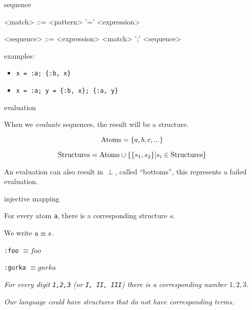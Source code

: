\begin{frame}{sequence}

\begin{grammar}
  <match> ::=  <pattern> '=' <expression>
\end{grammar}

\pause
\begin{grammar}
  <sequence> ::=  <expression> \alt <match> ';' <sequence>
\end{grammar}

\pause\vspace{20pt}

examples:
 \begin{itemize}
   \pause \item {\tt x = :a; \{:b, x\}}
   \pause \item {\tt x = :a; y = \{:b, x\}; \{:a, y\}}
 \end{itemize}

\end{frame}

\begin{frame}{evaluation}

  When we {\em evaluate} sequences, the result will be a structure.
  \pause\vspace{10pt}

$${\rm Atoms} =  \{a,b,c, ...\}$$

$${\rm Structures} = {\rm Atoms} \cup \{\{s_1, s_2\} | s_i \in {\rm Structures}\}$$

\pause \vspace{20pt}
An evaluation can also result in $\perp$, called ``bottoms'', this represents a failed evaluation.

\end{frame}

\begin{frame}{injective mapping}

\pause \vspace{20pt}
For every atom {\tt a}, there is a corresponding structure $s$.

\vspace{10pt}
\hspace{40pt}We write ${\rm a} \equiv s$.

\pause \vspace{10pt}
\hspace{40pt} {\tt :foo} $\equiv foo$

\hspace{40pt} {\tt :gurka} $\equiv gurka$


\pause \vspace{20pt}

{\em For every digit \texttt{1,2,3} (or \texttt{I, II, III}) there is a corresponding number $1,2,3$.}

\pause \vspace{20pt}
{\em Our language could have structures that do not have corresponding terms.}

\end{frame}


